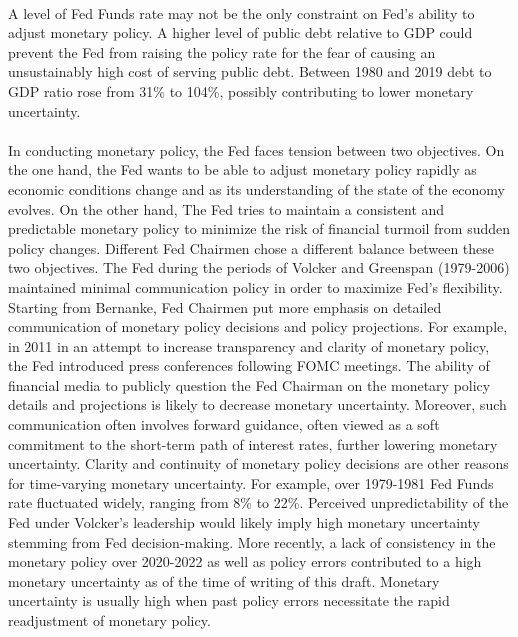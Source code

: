 \documentclass[12pt]{article}
\begin{document}
\paragraph{}
A level of Fed Funds rate may not be the only constraint on Fed's ability to adjust monetary policy. A higher level of public debt relative to GDP could prevent the Fed from raising the policy rate for the fear of causing an unsustainably high cost of serving public debt. Between 1980 and 2019 debt to GDP ratio rose from 31\% to 104\%, possibly contributing to lower monetary uncertainty. 
\paragraph{}
In conducting monetary policy, the Fed faces tension between two objectives. On the one hand, the Fed wants to be able to adjust monetary policy rapidly as economic conditions change and as its understanding of the state of the economy evolves. On the other hand, The Fed tries to maintain a consistent and predictable monetary policy to minimize the risk of financial turmoil from sudden policy changes. Different Fed Chairmen chose a different balance between these two objectives. The Fed during the periods of Volcker and Greenspan (1979-2006) maintained minimal communication policy in order to maximize Fed's flexibility. Starting from Bernanke, Fed Chairmen put more emphasis on detailed communication of monetary policy decisions and policy projections. For example, in 2011 in an attempt to increase transparency and clarity of monetary policy, the Fed introduced press conferences following FOMC meetings. The ability of financial media to publicly question the Fed Chairman on the monetary policy details and projections is likely to decrease monetary uncertainty. Moreover, such communication often involves forward guidance, often viewed as a soft commitment to the short-term path of interest rates, further lowering monetary uncertainty. Clarity and continuity of monetary policy decisions are other reasons for time-varying monetary uncertainty. For example, over 1979-1981 Fed Funds rate fluctuated widely, ranging from 8\% to 22\%. Perceived unpredictability of the Fed under Volcker's leadership would likely imply high monetary uncertainty stemming from Fed decision-making. More recently, a lack of consistency in the monetary policy over 2020-2022 as well as policy errors contributed to a high monetary uncertainty as of the time of writing of this draft. Monetary uncertainty is usually high when past policy errors necessitate the rapid readjustment of monetary policy.
\end{document}
